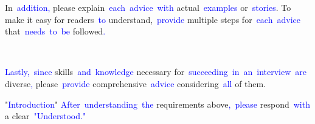 \documentclass{article}
\begin{document}
\begin{tcolorbox}[colframe=black,colback=white]
In\textcolor{blue}{~addition}\textcolor{blue}{,} please explain\textcolor{blue}{~each}\textcolor{blue}{~advice}\textcolor{blue}{~with} actual\textcolor{blue}{~examples} or\textcolor{blue}{~stories}. To make it easy for readers\textcolor{blue}{~to} understand,\textcolor{blue}{~provide} multiple steps for\textcolor{blue}{~each}\textcolor{blue}{~advice} that\textcolor{blue}{~needs}\textcolor{blue}{~to}\textcolor{blue}{~be} followed\textcolor{blue}{.}\textcolor{blue}{~

}\textcolor{blue}{Lastly}\textcolor{blue}{,}\textcolor{blue}{~since} skills\textcolor{blue}{~and}\textcolor{blue}{~knowledge} necessary for\textcolor{blue}{~succeeding}\textcolor{blue}{~in}\textcolor{blue}{~an}\textcolor{blue}{~interview}\textcolor{blue}{~are} diverse\textcolor{blue}{,} please\textcolor{blue}{~provide} comprehensive\textcolor{blue}{~advice} considering\textcolor{blue}{~all} of them.

"\textcolor{blue}{Introduction}"
\textcolor{blue}{After}\textcolor{blue}{~understanding}\textcolor{blue}{~the} requirements above\textcolor{blue}{,}\textcolor{blue}{~please} respond\textcolor{blue}{~with} a clear\textcolor{blue}{~"}\textcolor{blue}{Under}\textcolor{blue}{stood}\textcolor{blue}{."}\textcolor{blue}{}
\end{tcolorbox}
\end{document}

